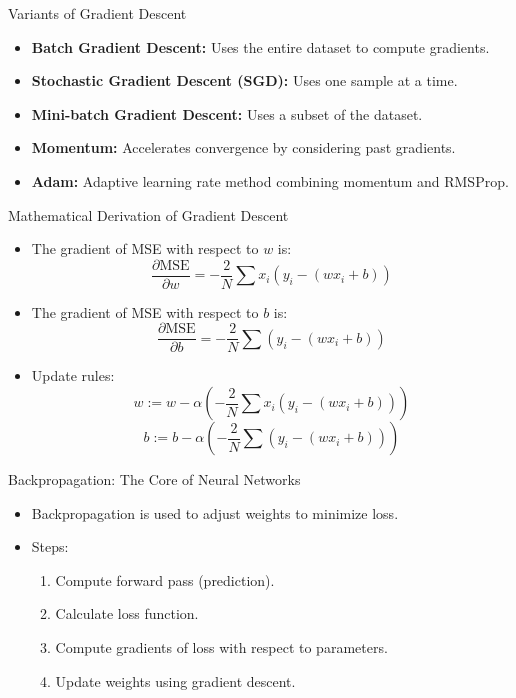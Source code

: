 \documentclass{beamer}
\begin{document}
\begin{frame}{Variants of Gradient Descent}
    \begin{itemize}
        \item \textbf{Batch Gradient Descent:} Uses the entire dataset to compute gradients.
        \item \textbf{Stochastic Gradient Descent (SGD):} Uses one sample at a time.
        \item \textbf{Mini-batch Gradient Descent:} Uses a subset of the dataset.
        \item \textbf{Momentum:} Accelerates convergence by considering past gradients.
        \item \textbf{Adam:} Adaptive learning rate method combining momentum and RMSProp.
    \end{itemize}
\end{frame}

\begin{frame}{Mathematical Derivation of Gradient Descent}
    \begin{itemize}
        \item The gradient of MSE with respect to \(w\) is:
        \[
        \frac{\partial \text{MSE}}{\partial w} = -\frac{2}{N} \sum x_i (y_i - (wx_i + b))
        \]
        \item The gradient of MSE with respect to \(b\) is:
        \[
        \frac{\partial \text{MSE}}{\partial b} = -\frac{2}{N} \sum (y_i - (wx_i + b))
        \]
        \item Update rules:
        \[
        w := w - \alpha \left( -\frac{2}{N} \sum x_i (y_i - (wx_i + b)) \right)
        \]
        \[
        b := b - \alpha \left( -\frac{2}{N} \sum (y_i - (wx_i + b)) \right)
        \]
    \end{itemize}
\end{frame}

\begin{frame}{Backpropagation: The Core of Neural Networks}
    \begin{itemize}
        \item Backpropagation is used to adjust weights to minimize loss.
        \item Steps:
        \begin{enumerate}
            \item Compute forward pass (prediction).
            \item Calculate loss function.
            \item Compute gradients of loss with respect to parameters.
            \item Update weights using gradient descent.
        \end{enumerate}
    \end{itemize}
\end{frame}
\end{document}
